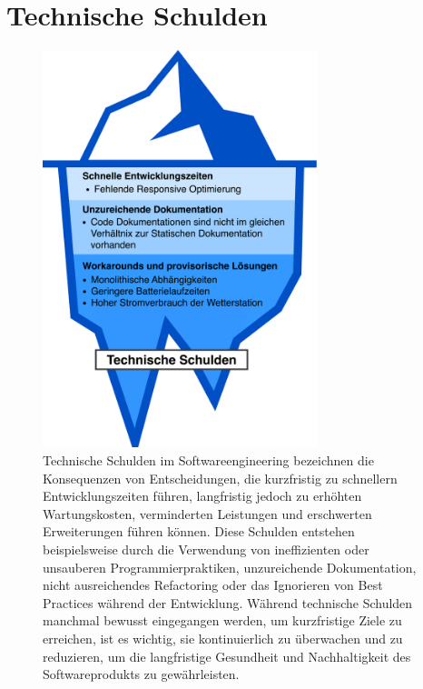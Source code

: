 \documentclass[
]{article}
\begin{document}
\section{Technische Schulden}
\begin{figure}[H]
	\centering
	\includegraphics[width=80mm]{resources/technischeSchulden.drawio.png}
	\caption{Technische Schulden im Softwareengineering bezeichnen die Konsequenzen von Entscheidungen, die kurzfristig zu schnellern Entwicklungszeiten führen, langfristig jedoch zu erhöhten Wartungskosten, verminderten Leistungen und erschwerten Erweiterungen führen können.
    Diese Schulden entstehen beispielsweise durch die Verwendung von ineffizienten oder unsauberen Programmierpraktiken, unzureichende Dokumentation, nicht ausreichendes Refactoring oder das Ignorieren von Best Practices während der Entwicklung.
    Während technische Schulden manchmal bewusst eingegangen werden, um kurzfristige Ziele zu erreichen, ist es wichtig, sie kontinuierlich zu überwachen und zu reduzieren, um die langfristige Gesundheit und Nachhaltigkeit des Softwareprodukts zu gewährleisten.}
	\label{fig:TechnischeSchulden}
\end{figure}  
\end{document}
